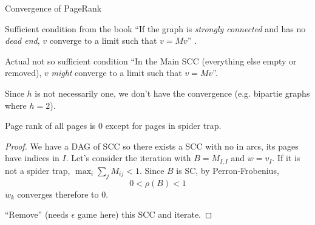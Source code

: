 \documentclass[10pt]{beamer}
\begin{document}
\begin{frame}[allowframebreaks]{Convergence of PageRank}
  \begin{block}{Sufficient condition from the book}
    ``If the graph is \emph{strongly connected} and has no \emph{dead end}, $v$ converge to a limit such that $v = Mv$''
    \cite[p.~185]{leskovec2014mining}.
  \end{block}
  \begin{block}{Actual not so sufficient condition}
    ``In the Main SCC (everything else empty or removed), $v$ \emph{might} converge to a limit such that $v = Mv$''.
  \end{block}
  Since $h$ is not necessarily one, we don't have the convergence (e.g. bipartie graphs where $h=2$).
  \framebreak

  Page rank of all pages is 0 except for pages in spider trap.
  \begin{proof}
    We have a DAG of SCC so there exists a SCC with no in arcs, its pages have indices in $I$.
    Let's consider the iteration with $B = M_{I,I}$ and $w=v_I$.
    If it is not a spider trap, $\max_i \sum_j M_{ij} < 1$.
    Since $B$ is SC, by Perron-Frobenius,
    \[ 0 < \rho(B) < 1 \]
    $w_k$ converges therefore to 0.

    ``Remove'' (needs $\epsilon$ game here) this SCC and iterate.
  \end{proof}
\end{frame}
\end{document}
